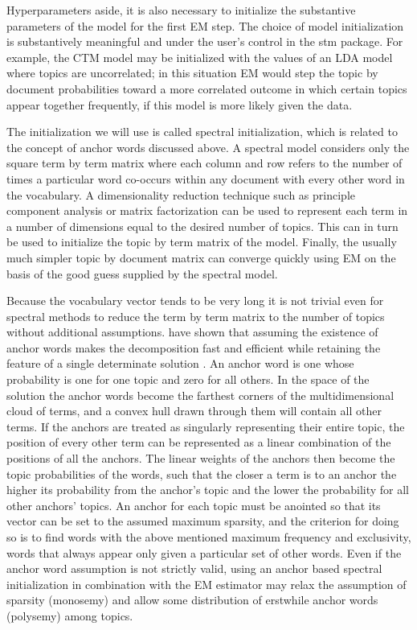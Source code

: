 \documentclass[]{book}
\theoremstyle{definition}
\theoremstyle{definition}
\theoremstyle{definition}
\theoremstyle{remark}
\begin{document}
Hyperparameters aside, it is also necessary to initialize the
substantive parameters of the model for the first EM step. The choice of
model initialization is substantively meaningful and under the user's
control in the stm package. For example, the CTM model may be
initialized with the values of an LDA model where topics are
uncorrelated; in this situation EM would step the topic by document
probabilities toward a more correlated outcome in which certain topics
appear together frequently, if this model is more likely given the data.

The initialization we will use is called spectral initialization, which
is related to the concept of anchor words discussed above. A spectral
model considers only the square term by term matrix where each column
and row refers to the number of times a particular word co-occurs within
any document with every other word in the vocabulary. A dimensionality
reduction technique such as principle component analysis or matrix
factorization can be used to represent each term in a number of
dimensions equal to the desired number of topics. This can in turn be
used to initialize the topic by term matrix of the model. Finally, the
usually much simpler topic by document matrix can converge quickly using
EM on the basis of the good guess supplied by the spectral model.

Because the vocabulary vector tends to be very long it is not trivial
even for spectral methods to reduce the term by term matrix to the
number of topics without additional assumptions.
\citet{Arora2018Learning} have shown that assuming the existence of
anchor words makes the decomposition fast and efficient while retaining
the feature of a single determinate solution
\citep{Roberts2016Navigating}. An anchor word is one whose probability
is one for one topic and zero for all others. In the space of the
solution the anchor words become the farthest corners of the
multidimensional cloud of terms, and a convex hull drawn through them
will contain all other terms. If the anchors are treated as singularly
representing their entire topic, the position of every other term can be
represented as a linear combination of the positions of all the anchors.
The linear weights of the anchors then become the topic probabilities of
the words, such that the closer a term is to an anchor the higher its
probability from the anchor's topic and the lower the probability for
all other anchors' topics. An anchor for each topic must be anointed so
that its vector can be set to the assumed maximum sparsity, and the
criterion for doing so is to find words with the above mentioned maximum
frequency and exclusivity, words that always appear only given a
particular set of other words. Even if the anchor word assumption is not
strictly valid, using an anchor based spectral initialization in
combination with the EM estimator may relax the assumption of sparsity
(monosemy) and allow some distribution of erstwhile anchor words
(polysemy) among topics.
\end{document}
